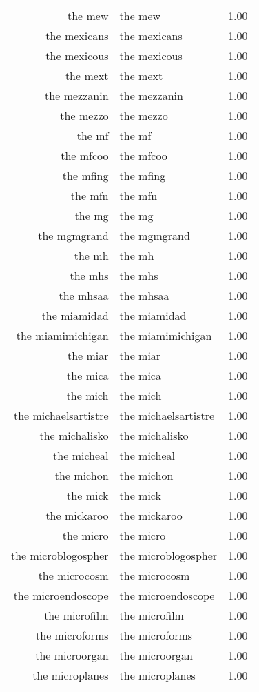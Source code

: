 \begin{table}[ht]
\begin{tabular}{rlr}
  the mew & the mew & 1.00 \\ 
  the mexicans & the mexicans & 1.00 \\ 
  the mexicous & the mexicous & 1.00 \\ 
  the mext & the mext & 1.00 \\ 
  the mezzanin & the mezzanin & 1.00 \\ 
  the mezzo & the mezzo & 1.00 \\ 
  the mf & the mf & 1.00 \\ 
  the mfcoo & the mfcoo & 1.00 \\ 
  the mfing & the mfing & 1.00 \\ 
  the mfn & the mfn & 1.00 \\ 
  the mg & the mg & 1.00 \\ 
  the mgmgrand & the mgmgrand & 1.00 \\ 
  the mh & the mh & 1.00 \\ 
  the mhs & the mhs & 1.00 \\ 
  the mhsaa & the mhsaa & 1.00 \\ 
  the miamidad & the miamidad & 1.00 \\ 
  the miamimichigan & the miamimichigan & 1.00 \\ 
  the miar & the miar & 1.00 \\ 
  the mica & the mica & 1.00 \\ 
  the mich & the mich & 1.00 \\ 
  the michaelsartistre & the michaelsartistre & 1.00 \\ 
  the michalisko & the michalisko & 1.00 \\ 
  the micheal & the micheal & 1.00 \\ 
  the michon & the michon & 1.00 \\ 
  the mick & the mick & 1.00 \\ 
  the mickaroo & the mickaroo & 1.00 \\ 
  the micro & the micro & 1.00 \\ 
  the microblogospher & the microblogospher & 1.00 \\ 
  the microcosm & the microcosm & 1.00 \\ 
  the microendoscope & the microendoscope & 1.00 \\ 
  the microfilm & the microfilm & 1.00 \\ 
  the microforms & the microforms & 1.00 \\ 
  the microorgan & the microorgan & 1.00 \\ 
  the microplanes & the microplanes & 1.00 \\ 

\end{tabular}
\end{table}
